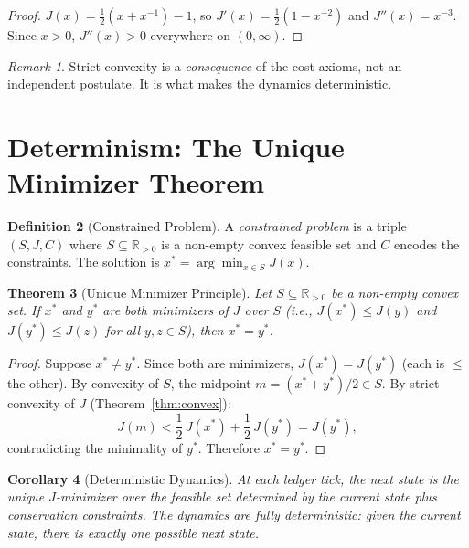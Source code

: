 \documentclass[12pt,a4paper]{article}
\newtheorem{theorem}{Theorem}[section]
\newtheorem{corollary}[theorem]{Corollary}
\theoremstyle{definition}
\newtheorem{definition}[theorem]{Definition}
\theoremstyle{remark}
\newtheorem{remark}[theorem]{Remark}
\begin{document}
\begin{proof}
$J(x) = \tfrac{1}{2}(x + x^{-1}) - 1$, so $J'(x) = \tfrac{1}{2}(1 -
x^{-2})$ and $J''(x) = x^{-3}$.  Since $x > 0$, $J''(x) > 0$ everywhere
on $(0, \infty)$.
\end{proof}

\begin{remark}
Strict convexity is a \emph{consequence} of the cost axioms, not an
independent postulate.  It is what makes the dynamics deterministic.
\end{remark}

\section{Determinism: The Unique Minimizer Theorem}
\label{sec:determinism}

\begin{definition}[Constrained Problem]
\label{def:problem}
A \emph{constrained problem} is a triple $(S, J, C)$ where $S \subseteq
\mathbb{R}_{>0}$ is a non-empty convex feasible set and $C$ encodes the
constraints.  The solution is $x^* = \arg\min_{x \in S} J(x)$.
\end{definition}

\begin{theorem}[Unique Minimizer Principle]
\label{thm:unique-min}
Let $S \subseteq \mathbb{R}_{>0}$ be a non-empty convex set.  If $x^*$
and $y^*$ are both minimizers of $J$ over $S$ (i.e.,
$J(x^*) \leq J(y)$ and $J(y^*) \leq J(z)$ for all $y, z \in S$),
then $x^* = y^*$.
\end{theorem}

\begin{proof}
Suppose $x^* \neq y^*$.  Since both are minimizers, $J(x^*) = J(y^*)$
(each is $\leq$ the other).  By convexity of $S$, the midpoint
$m = (x^* + y^*)/2 \in S$.  By strict convexity of $J$
(Theorem~\ref{thm:convex}):
\[
  J(m) < \frac{1}{2}\,J(x^*) + \frac{1}{2}\,J(y^*) = J(y^*),
\]
contradicting the minimality of $y^*$.  Therefore $x^* = y^*$.
\end{proof}

\begin{corollary}[Deterministic Dynamics]
\label{cor:determinism}
At each ledger tick, the next state is the unique $J$-minimizer over the
feasible set determined by the current state plus conservation constraints.
The dynamics are fully deterministic: given the current state, there is
exactly one possible next state.
\end{corollary}
\end{document}
